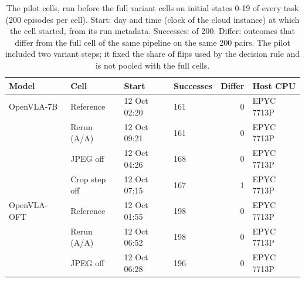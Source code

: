 \begin{table}[t]
\caption{The pilot cells, run before the full variant cells on initial states 0-19 of every task (200 episodes per cell). Start: day and time (clock of the cloud instance) at which the cell started, from its run metadata. Successes: of 200. Differ: outcomes that differ from the full cell of the same pipeline on the same 200 pairs. The pilot included two variant steps; it fixed the share of flips used by the decision rule and is not pooled with the full cells.}
\label{tab:pilot}
\centering
\footnotesize
\begin{tabular}{@{}llllrl@{}}
\toprule
Model & Cell & Start & Successes & Differ & Host CPU \\
\midrule
OpenVLA-7B & Reference & 12 Oct 02:20 & 161 & 0 & EPYC 7713P \\
 & Rerun (A/A) & 12 Oct 09:21 & 161 & 0 & EPYC 7713P \\
 & JPEG off & 12 Oct 04:26 & 168 & 0 & EPYC 7713P \\
 & Crop step off & 12 Oct 07:15 & 167 & 1 & EPYC 7713P \\
OpenVLA-OFT & Reference & 12 Oct 01:55 & 198 & 0 & EPYC 7713P \\
 & Rerun (A/A) & 12 Oct 06:52 & 198 & 0 & EPYC 7713P \\
 & JPEG off & 12 Oct 06:28 & 196 & 0 & EPYC 7713P \\
\bottomrule
\end{tabular}
\end{table}
